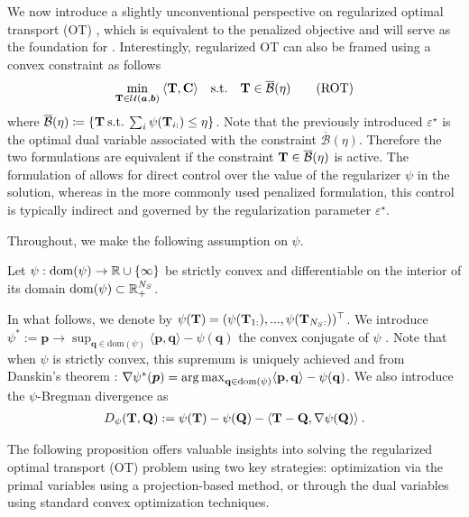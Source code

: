 We now introduce a slightly unconventional perspective on regularized optimal transport (OT) \citep{dessein2018regularized}, which is equivalent to the penalized objective and will serve as the foundation for .
Interestingly, regularized OT can also be framed using a convex constraint as follows
\begin{align}\label{eq:cot}
    \min_{{\mathbf{T}} \in {\mathcal{U}}(\bm{a}, \bm{b})} \: \langle {\mathbf{T}}, {\mathbf{C}} \rangle \quad \text{s.t.} \quad  {\mathbf{T}} \in \overline{\mathcal{B}}(\eta)
    \tag{ROT}
\end{align}
where $\overline{\mathcal{B}}(\eta) \coloneqq \{ {\mathbf{T}} \: \text{s.t.} \: \sum_i \psi({\mathbf{T}}_{i:}) \leq \eta \}$. Note that the previously introduced $\varepsilon^\star$ is the optimal dual variable associated with the constraint $\overline{\mathcal{B}}(\eta)$. Therefore the two formulations are equivalent if the constraint ${\mathbf{T}} \in \overline{\mathcal{B}}(\eta)$ is active. The formulation of  allows for direct control over the value of the regularizer \( \psi \) in the solution, whereas in the more commonly used penalized formulation, this control is typically indirect and governed by the regularization parameter \( \varepsilon^\star \).

Throughout, we make the following assumption on $\psi$.
\begin{assumption}\label{assumption_psi}
    Let $\psi: \mathrm{dom}(\psi) \to \mathbb{R} \cup \{\infty\}$ be strictly convex and differentiable on the interior of its domain $\mathrm{dom}(\psi) \subset \mathbb{R}^{N_S}_+$.
\end{assumption}

In what follows, we denote by $\psi({\mathbf{T}}) = (\psi({\mathbf{T}}_{1:}), ..., \psi({\mathbf{T}}_{N_S:}))^\top$.
We introduce $\psi^*:= \mathbf{p} \to \sup_{\mathbf{q} \in \mathrm{dom}(\psi)} \langle \mathbf{p}, \mathbf{q} \rangle - \psi(\mathbf{q})$ the convex conjugate of $\psi$ \citep{rockafellar1997convex}.
Note that when $\psi$ is strictly convex, this supremum is uniquely achieved and from Danskin's theorem \citep{danskin1966theory}: $\nabla \psi^*(\bm{p}) = \operatorname*{arg\,max}_{\mathbf{q} \in \mathrm{dom}(\psi)} \langle \mathbf{p}, \mathbf{q} \rangle - \psi(\mathbf{q})$. We also introduce the $\psi$-Bregman divergence as 
\begin{align}
    D_\psi({\mathbf{T}}, {\mathbf{Q}}) := \psi({\mathbf{T}}) - \psi({\mathbf{Q}}) - \langle {\mathbf{T}} - {\mathbf{Q}}, \nabla \psi({\mathbf{Q}}) \rangle \:.
\end{align} 

The following proposition offers valuable insights into solving the regularized optimal transport (OT) problem using two key strategies: optimization via the primal variables using a projection-based method, or through the dual variables using standard convex optimization techniques.

